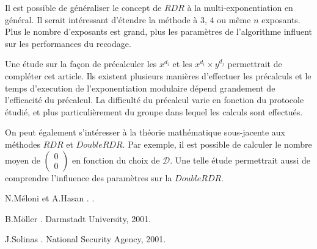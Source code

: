 \documentclass[12pt, a4paper]{memoir}
\newcommand{\doublezero}{\begin{pmatrix} 0 \\ 0 \end{pmatrix}}
\begin{document}
Il est possible de généraliser le concept de $RDR$ à la multi-exponentiation en général.
Il serait intéressant d'étendre la méthode à $3$, $4$ ou même $n$ exposants.
Plus le nombre d'exposants est grand, plus les paramètres de l'algorithme influent sur les performances du recodage.

Une étude sur la façon de précalculer les $x^{d_i}$ et les $x^{d_i} \times y^{d_j}$ permettrait de compléter
cet article. Ils existent plusieurs manières d'effectuer les précalculs et le temps d'execution de 
l'exponentiation modulaire dépend grandement de l'efficacité du précalcul.
La difficulté du précalcul varie en fonction du protocole étudié, et plus particulièrement du groupe dans 
lequel les calculs sont effectués.

On peut également s'intéresser à la théorie mathématique sous-jacente aux méthodes $RDR$ et $DoubleRDR$.
Par exemple, il est possible de calculer le nombre moyen de $\doublezero$ en fonction du choix de $\mathcal{D}$.
Une telle étude permettrait aussi de comprendre l'influence des paramètres sur la $DoubleRDR$.


\backmatter

%
\begin{thebibliography}{1}
 
 N.Méloni et A.Hasan
 .
.

B.Möller
.
\newblock Darmstadt University, 2001.

J.Solinas
.
\newblock National Security Agency, 2001.
\end{thebibliography}

%
\end{document}
